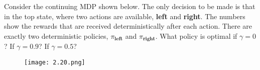 
\begin{exercise}[Exercise 3.22]

Consider the continuing MDP shown below.
The only decision to be made is that in the top state, where two actions are available, \textbf{left} and \textbf{right}.
The numbers show the rewards that are received deterministically after each action.
There are exactly two deterministic policies, $\pi_\textbf{left}$ and $\pi_\textbf{right}$.
What policy is optimal if $\gamma = 0$?
If $\gamma = 0.9$?
If $\gamma = 0.5$?

\begin{figure}[H]
    \centering
    \texttt{[image: 2.20.png]}
    \caption{}
    \label{fig:2.20}
\end{figure}

\end{exercise}


